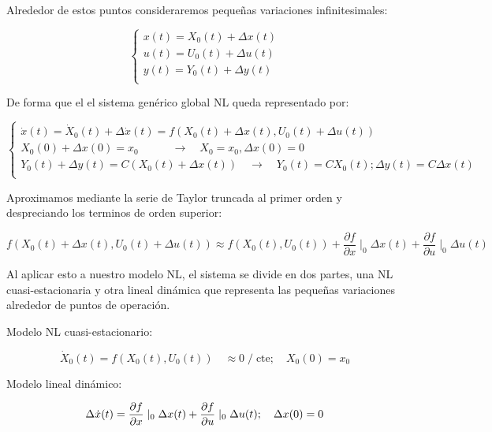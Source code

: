 \documentclass{article}
\begin{document}
Alrededor de estos puntos consideraremos pequeñas variaciones infinitesimales:

\begin{equation}
    \begin{cases}
        x(t) = X_{0}(t) + \Delta x(t)\\
        u(t) = U_{0}(t) + \Delta u(t)\\
        y(t) = Y_{0}(t) + \Delta y(t)\\
    \end{cases}
\end{equation}

De forma que el el sistema genérico global NL queda representado por:

\begin{equation}
    \begin{cases}
        \dot{x}(t) = \dot{X}_{0}(t) + \Delta\dot{x}(t) = f(X_{0}(t) + \Delta x(t), U_{0}(t) + \Delta u(t))\\
        X_{0}(0) + \Delta x(0) = x_{0} \quad\quad\quad \rightarrow \quad X_{0} = x_{0}, \Delta x(0) = 0 \\
        Y_{0}(t) + \Delta y(t) = C(X_{0}(t) + \Delta x(t)) \quad\rightarrow\quad Y_{0}(t) = C X_{0}(t); \Delta y(t) = C \Delta x(t)\\
    \end{cases}
\end{equation}

Aproximamos mediante la serie de Taylor truncada al primer orden y despreciando los terminos
de orden superior:

\begin{equation}
    f(X_{0}(t) + \Delta x(t), U_{0}(t) + \Delta u (t)) \approx f(X_{0}(t), U_{0}(t)) + \frac{\partial f}{\partial x}\mid_{0}\Delta x(t) + \frac{\partial f}{\partial u}\mid_{0}\Delta u(t)
\end{equation}

Al aplicar esto a nuestro modelo NL, el sistema se divide en dos partes, una NL cuasi-estacionaria y otra 
lineal dinámica que representa las pequeñas variaciones alrededor de puntos de operación.

Modelo NL cuasi-estacionario:

\begin{equation}
    \dot{X}_{0}(t) = f(X_{0}(t), U_{0}(t)) \quad \approx 0 \;/\; \text{cte}; \quad X_{0}(0) = x_{0}
\end{equation}

Modelo lineal dinámico:

\begin{equation}
    \Delta\dot{x}(t) = \frac{\partial f}{\partial x}\mid_{0}\Delta x(t) + \frac{\partial f}{\partial u}\mid_{0}\Delta u(t); \quad \Delta x(0) = 0\\
\end{equation}
\end{document}
